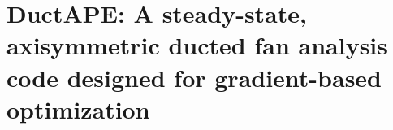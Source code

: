 \chapter{DuctAPE: A steady-state, axisymmetric ducted fan analysis code designed for gradient-based optimization}
\label{ch:ductape}






